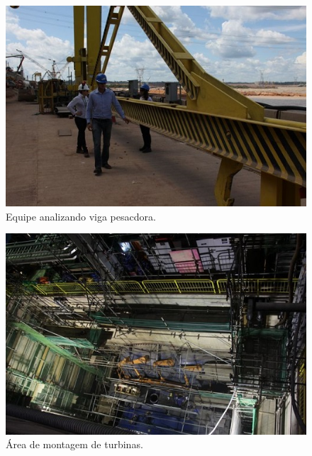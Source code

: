 \begin{figure}[h!]
  \centering
  \includegraphics[width=1\linewidth]{Fotos/Novembro2013/3.jpg}
  \caption{Equipe analizando viga pesacdora.}
  \label{nov20133}
\end{figure}

\begin{figure}[h!]
  \centering
  \includegraphics[width=1\linewidth]{Fotos/Novembro2013/4.jpg}
  \caption{Área de montagem de turbinas.}
  \label{nov20134}
\end{figure}